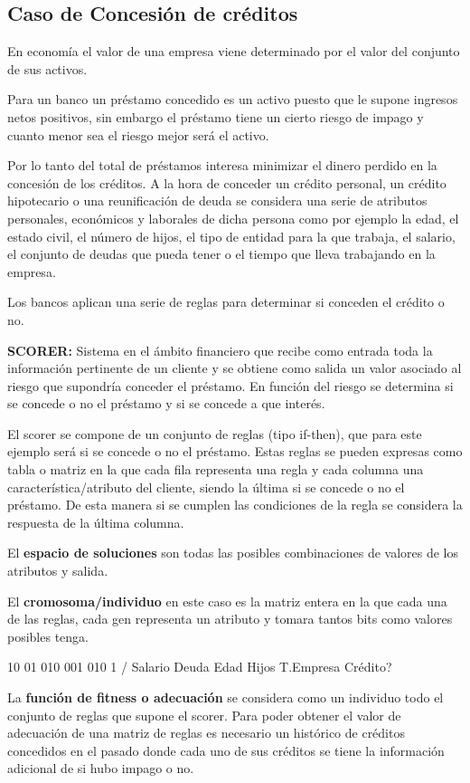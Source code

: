 \documentclass[12pt, twoside, openright]{report} %
\begin{document}
\subsection{Caso de Concesión de créditos}
En economía el valor de una empresa viene determinado por el valor del conjunto de sus activos.

Para un banco un préstamo concedido es un activo puesto que le supone ingresos netos positivos, sin embargo el préstamo tiene un cierto riesgo de impago y cuanto menor sea el riesgo mejor será el activo.

Por lo tanto del total de préstamos interesa minimizar el dinero perdido en la concesión de los créditos. A la hora de conceder un crédito personal, un crédito hipotecario o una reunificación de deuda se considera una serie de atributos personales, económicos y laborales de dicha persona como por ejemplo la edad, el estado civil, el número de hijos, el tipo de entidad para la que trabaja, el salario, el conjunto de deudas que pueda tener o el tiempo que lleva trabajando en la empresa.

Los bancos aplican una serie de reglas para determinar si conceden el crédito o no.

\textbf{SCORER:} Sistema en el ámbito financiero que recibe como entrada toda la información pertinente de un cliente y se obtiene como salida un valor asociado al riesgo que supondría conceder el préstamo. En función del riesgo se determina si se concede o no el préstamo y si se concede a que interés.

El scorer se compone de un conjunto de reglas (tipo if-then), que para este ejemplo será si se concede o no el préstamo. Estas reglas se pueden expresas como tabla o matriz en la que cada fila representa una regla y cada columna una característica/atributo del cliente, siendo la última si se concede o no el préstamo. De esta manera si se cumplen las condiciones de la regla se considera la respuesta de la última columna.

El \textbf{espacio de soluciones} son todas las posibles combinaciones de valores de los atributos y salida.

El \textbf{cromosoma/individuo} en este caso es la matriz entera en la que cada una de las reglas, cada gen representa un atributo y tomara tantos bits como valores posibles tenga.

10 01 010 001 010 1 / Salario Deuda Edad Hijos T.Empresa Crédito?

La \textbf{función de fitness o adecuación} se considera como un individuo todo el conjunto de reglas que supone el scorer. Para poder obtener el valor de adecuación de una matriz de reglas es necesario un histórico de créditos concedidos en el pasado donde cada uno de sus créditos se tiene la información adicional de si hubo impago o no.
\end{document}
